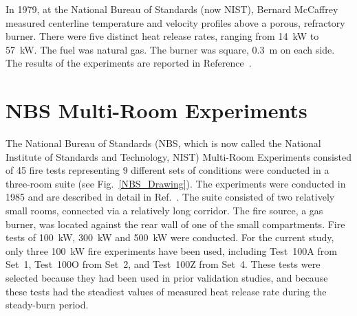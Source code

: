 In 1979, at the National Bureau of Standards (now NIST), Bernard McCaffrey measured centerline temperature and velocity profiles above a porous, refractory burner.
There were five distinct heat release rates, ranging from 14~kW to 57~kW. The fuel was natural gas. The burner was square, 0.3~m on each side.
The results of the experiments are reported in Reference~\cite{McCaffrey:NBSIR_79-1910}.


\section{NBS Multi-Room Experiments}

The National Bureau of Standards (NBS, which is now called the National Institute of Standards and Technology, NIST) Multi-Room Experiments consisted of 45 fire tests representing 9 different sets of conditions were conducted in a three-room suite (see Fig.~\ref{NBS_Drawing}). The experiments were conducted in 1985 and are described in detail in Ref.~\cite{Peacock:NBS_Multi-Room}. The suite consisted of two relatively small rooms, connected via a relatively long corridor. The fire source, a gas burner, was located against the rear wall of one of the small compartments.  Fire tests of 100~kW, 300~kW and 500~kW were conducted. For the current study, only three 100~kW fire experiments have been used, including Test~100A from Set~1, Test~100O from Set~2, and Test~100Z from Set~4. These tests were selected because they had been used in prior validation studies, and because these tests had the steadiest values of measured heat release rate during the steady-burn period.

